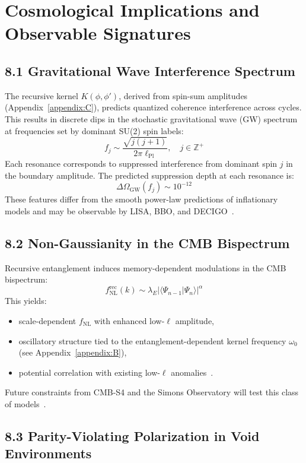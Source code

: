 \section{Cosmological Implications and Observable Signatures}
\label{sec:cosmological-implications}

\subsection{8.1 Gravitational Wave Interference Spectrum}

The recursive kernel \( K(\phi, \phi') \), derived from spin-sum amplitudes (Appendix~\ref{appendix:C}), predicts quantized coherence interference across cycles. This results in discrete dips in the stochastic gravitational wave (GW) spectrum at frequencies set by dominant SU(2) spin labels:
\[
f_j \sim \frac{\sqrt{j(j+1)}}{2\pi \ell_{\text{Pl}}}, \quad j \in \mathbb{Z}^+
\]
Each resonance corresponds to suppressed interference from dominant spin \( j \) in the boundary amplitude. The predicted suppression depth at each resonance is:
\[
\Delta \Omega_{\text{GW}}(f_j) \sim 10^{-12}
\]
These features differ from the smooth power-law predictions of inflationary models and may be observable by LISA, BBO, and DECIGO~\cite{maggiore_gravitational_2000, smith_gravitational_2006}.

\subsection{8.2 Non-Gaussianity in the CMB Bispectrum}

Recursive entanglement induces memory-dependent modulations in the CMB bispectrum:
\[
f_{\text{NL}}^{\text{rec}}(k) \sim \lambda_E |\langle \Psi_{n-1} | \Psi_n \rangle|^\alpha
\]
This yields:
\begin{itemize}
    \item scale-dependent \( f_{\text{NL}} \) with enhanced low-\( \ell \) amplitude,
    \item oscillatory structure tied to the entanglement-dependent kernel frequency \( \omega_0 \) (see Appendix~\ref{appendix:B}),
    \item potential correlation with existing low-\( \ell \) anomalies~\cite{planck2019inflation}.
\end{itemize}
Future constraints from CMB-S4 and the Simons Observatory will test this class of models~\cite{cmbs4forecast2019}.

\subsection{8.3 Parity-Violating Polarization in Void Environments}

